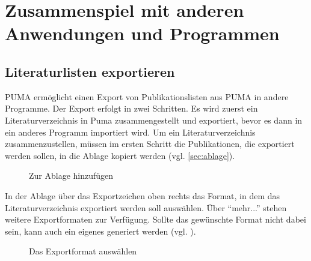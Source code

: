 \chapter{Zusammenspiel mit anderen Anwendungen und Programmen}
\label{ch:exportImport}
\label{sec:EExpo}

\section{Literaturlisten exportieren}
\label{sec:llExportieren}
PUMA ermöglicht einen Export von Publikationslisten aus PUMA in andere Programme.
Der Export erfolgt in zwei Schritten. Es wird zuerst ein Literaturverzeichnis in Puma zusammengestellt und exportiert, bevor es dann in ein anderes Programm importiert wird.
Um ein Literaturverzeichnis zusammenzustellen, müssen im ersten Schritt die Publikationen, die exportiert werden sollen, in die Ablage kopiert werden (vgl. \autoref{sec:ablage}).
		
\begin{figure}[h!]
 \centering
 \caption{Zur Ablage hinzufügen}
 \label{fig:zurAblageHinzu}
\end{figure}

In der Ablage über das Exportzeichen oben rechts das Format, in dem das Literaturverzeichnis exportiert werden soll auswählen. Über \enquote{mehr...} stehen weitere Exportformaten zur Verfügung. Sollte das gewünschte Format nicht dabei sein, kann auch ein eigenes generiert werden (vgl. ).
\begin{figure}[h!]
 \centering
 \caption{Das Exportformat auswählen}
 \label{fig:exportformatAuswaehlen}
\end{figure}



